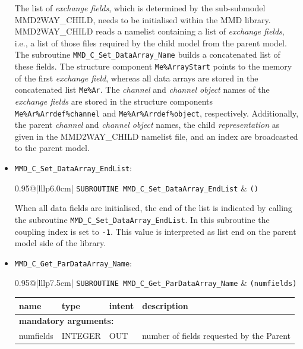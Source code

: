 \documentclass[twoside]{article}
\begin{document}
\begin{itemize}
The list of {\it exchange fields},
which is determined by the sub-submodel MMD2WAY\_CHILD, needs to be initialised 
within the MMD library. MMD2WAY\_CHILD reads a namelist containing a
list of {\it exchange fields}, i.e., a list of those files required by
the child model from the parent model.
The subroutine \verb|MMD_C_Set_DataArray_Name| builds a concatenated list of
these fields.
 The structure component \verb|Me%ArrayStart| points to the memory of the first 
 {\it exchange field}, whereas all data arrays are
 stored in the concatenated list \verb|Me%Ar|. The {\it channel} and {\it channel
 object} names of the {\it exchange fields} are stored in the structure 
components \verb|Me%Ar%Arrdef%channel| and \verb|Me%Ar%Arrdef%object|, 
respectively.
Additionally, the parent {\it channel} and {\it channel object} names, the 
child {\it representation} as given in the MMD2WAY\_CHILD namelist
file, and an index are broadcasted to the parent model.

\item  \verb|MMD_C_Set_DataArray_EndList|:\\
\vspace*{-0.3cm}

\begin{tabular*}{0.95\textwidth}{@{\extracolsep\fill}|lllp{6.0cm}|}
\hline
{}
{\tt SUBROUTINE MMD\_C\_Set\_DataArray\_EndList} &
{\tt ()}\\
\hline
\end{tabular*}
\smallskip
\vspace*{-0.3cm}

When all data fields are initialised, the end of the list is indicated by 
calling the subroutine \verb|MMD_C_Set_DataArray_EndList|.
In this subroutine the coupling index is set to \verb|-1|. This value is 
interpreted as list end on the parent model side of the library.

\item \verb|MMD_C_Get_ParDataArray_Name|:\\
\vspace*{-0.3cm}

\begin{tabular*}{0.95\textwidth}{@{\extracolsep\fill}|lllp{7.5cm}|}
\hline
{}
{\tt  SUBROUTINE MMD\_C\_Get\_ParDataArray\_Name} &
{\tt (numfields)}\\
\hline
\end{tabular*}
\begin{tabular*}{0.95\textwidth}{@{\extracolsep\fill}|lllp{7.5cm}|}
name & type & intent & description\\
\hline
\multicolumn{4}{|l|}{\bf mandatory arguments:}\\
 numfields & {\footnotesize INTEGER} & OUT &  number of fields
 requested by the Parent \\
\hline
\end{tabular*}
\smallskip


\end{itemize}
\end{document}
